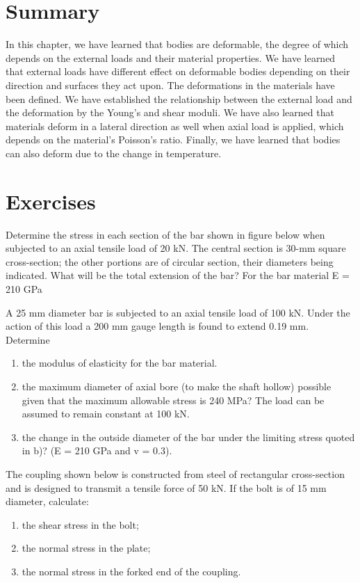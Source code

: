 \documentclass[
10pt,
a4paper,
openany,
svgnames,
]{book} %
\begin{document}
\section*{Summary}

In this chapter, we have learned that bodies are deformable, the degree of which depends on the external loads and their material properties. We have learned that external loads have different effect on deformable bodies depending on their direction and surfaces they act upon. The deformations in the materials have been defined. We have established the relationship between the external load and the deformation by the Young’s and shear moduli. We have also learned that materials deform in a lateral direction as well when axial load is applied, which depends on the material’s Poisson’s ratio. Finally, we have learned that bodies can also deform due to the change in temperature.

\section*{Exercises}

\begin{exercises}

  \exercise Determine the stress in each section of the bar shown in figure below when subjected to an axial tensile load of 20 kN. The central section is 30-mm square cross-section; the other portions are of circular section, their diameters being indicated. What will be the total extension of the bar? For the bar material E = 210 GPa
  
  \exercise A 25 mm diameter bar is subjected to an axial tensile load of 100 kN. Under the action of this load a 200 mm gauge length is found to extend 0.19 mm. Determine
  \begin{enumerate}
  \item the modulus of elasticity for the bar material.
  \item the maximum diameter of axial bore (to make the shaft hollow) possible given that the maximum allowable stress is 240 MPa? The load can be assumed to remain constant at 100 kN.
  \item the change in the outside diameter of the bar under the limiting stress quoted in b)? (E = 210 GPa and v = 0.3).
  \end{enumerate} 

  \exercise The coupling shown below is constructed from steel of rectangular cross-section and is designed to transmit a tensile force of 50 kN. If the bolt is of 15 mm diameter, calculate:
  \begin{enumerate}
  \item the shear stress in the bolt;
  \item the normal stress in the plate;
  \item the normal stress in the forked end of the coupling.
  \end{enumerate}
\end{exercises}
\end{document}
